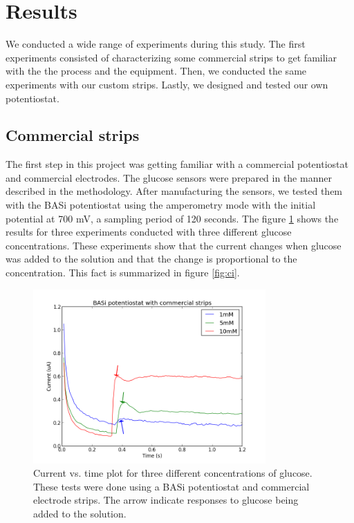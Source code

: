 \section{Results}
We conducted a wide range of experiments during this study. The first experiments consisted of characterizing some commercial strips to get familiar with the the process and the equipment. Then, we conducted the same experiments with our custom strips. Lastly, we designed and tested our own potentiostat.

\subsection{Commercial strips}
The first step in this project was getting familiar with a commercial potentiostat and commercial electrodes. The glucose sensors were prepared in the manner described in the methodology. After manufacturing the sensors, we tested them with the BASi potentiostat using the amperometry mode with the initial potential at 700 mV, a sampling period of 120 seconds. The figure \ref{fig:basi} shows the results for three experiments conducted with three different glucose concentrations. These experiments show that the current changes when glucose was added to the solution and that the change is proportional to the concentration. This fact is summarized in figure \ref{fig:ci}.


\begin{figure}[h] 
\begin{center}
\includegraphics[width=3.5in]{../figures/basi.png}
\end{center}
\caption{Current vs. time plot for three different concentrations of glucose. These tests were done using a BASi potentiostat and commercial electrode strips. The arrow indicate responses to glucose being added to the solution.}
\label{fig:basi}
\end{figure}

